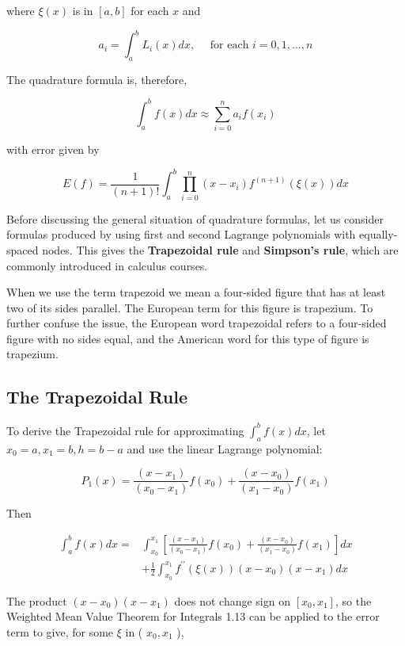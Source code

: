 where $\xi(x)$ is in $[a, b]$ for each $x$ and

$$
a_{i}=\int_{a}^{b} L_{i}(x) d x, \quad \text { for each } i=0,1, \ldots, n
$$

The quadrature formula is, therefore,

$$
\int_{a}^{b} f(x) d x \approx \sum_{i=0}^{n} a_{i} f\left(x_{i}\right)
$$

with error given by

$$
E(f)=\frac{1}{(n+1)!} \int_{a}^{b} \prod_{i=0}^{n}\left(x-x_{i}\right) f^{(n+1)}(\xi(x)) d x
$$

Before discussing the general situation of quadrature formulas, let us consider formulas produced by using first and second Lagrange polynomials with equally-spaced nodes. This gives the {\bf Trapezoidal rule} and {\bf Simpson's rule}, which are commonly introduced in calculus courses.

When we use the term trapezoid we mean a four-sided figure that has at least two of its sides parallel. The European term for this figure is trapezium. To further confuse the issue, the European word trapezoidal refers to a four-sided figure with no sides equal, and the American word for this type of figure is trapezium.

\subsection*{The Trapezoidal Rule}
To derive the Trapezoidal rule for approximating $\int_{a}^{b} f(x) d x$, let $x_{0}=a, x_{1}=b, h=b-a$ and use the linear Lagrange polynomial:

$$
P_{1}(x)=\frac{\left(x-x_{1}\right)}{\left(x_{0}-x_{1}\right)} f\left(x_{0}\right)+\frac{\left(x-x_{0}\right)}{\left(x_{1}-x_{0}\right)} f\left(x_{1}\right)
$$

Then


\begin{equation}\label{eqn:traprule1}
\begin{split}
\int_{a}^{b} f(x) d x= & \int_{x_{0}}^{x_{1}}\left[\frac{\left(x-x_{1}\right)}{\left(x_{0}-x_{1}\right)} f\left(x_{0}\right)+\frac{\left(x-x_{0}\right)}{\left(x_{1}-x_{0}\right)} f\left(x_{1}\right)\right] d x \\
& +\frac{1}{2} \int_{x_{0}}^{x_{1}} f^{\prime \prime}(\xi(x))\left(x-x_{0}\right)\left(x-x_{1}\right) d x 
\end{split}
\end{equation}


The product $\left(x-x_{0}\right)\left(x-x_{1}\right)$ does not change sign on $\left[x_{0}, x_{1}\right]$, so the Weighted Mean Value Theorem for Integrals 1.13 can be applied to the error term to give, for some $\xi$ in ( $x_{0}, x_{1}$ ),

